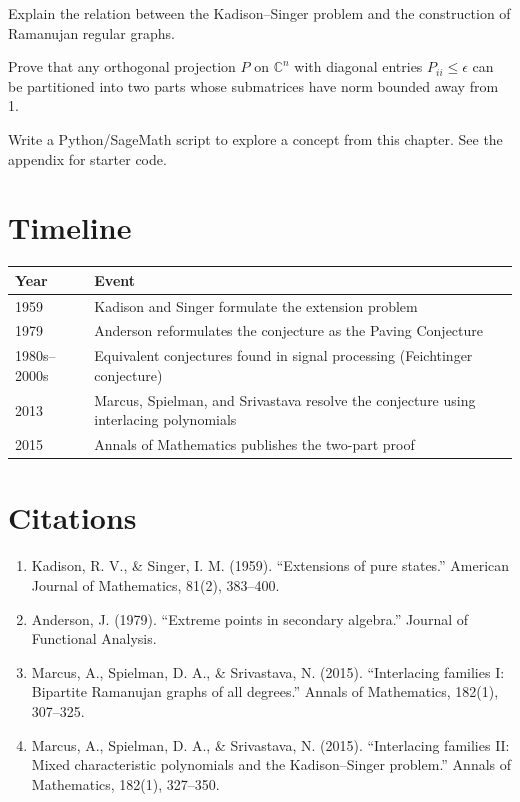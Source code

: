 \begin{exercise}[Intermediate]
Explain the relation between the Kadison--Singer problem and the construction of Ramanujan regular graphs.
\end{exercise}

\begin{exercise}[Challenge]
Prove that any orthogonal projection $P$ on $\mathbb{C}^n$ with diagonal entries $P_{ii} \leq \epsilon$ can be partitioned into two parts whose submatrices have norm bounded away from 1.
\end{exercise}

\begin{exercise}[Computational]
Write a Python/SageMath script to explore a concept from this chapter. See the appendix for starter code.
\end{exercise}

\section{Timeline}

\begin{tabularx}{\linewidth}{lX}
\toprule
\textbf{Year} & \textbf{Event} \\ \midrule
1959 & Kadison and Singer formulate the extension problem \cite{kadison1959} \\ 
1979 & Anderson reformulates the conjecture as the Paving Conjecture \cite{anderson1979} \\ 
1980s--2000s & Equivalent conjectures found in signal processing (Feichtinger conjecture) \\ 
2013 & Marcus, Spielman, and Srivastava resolve the conjecture using interlacing polynomials \cite{marcus2015a, marcus2015b} \\ 
2015 & Annals of Mathematics publishes the two-part proof \\ \bottomrule
\end{tabularx}

\section{Citations}

\begin{enumerate}
\item Kadison, R. V., \& Singer, I. M. (1959). ``Extensions of pure states.'' American Journal of Mathematics, 81(2), 383--400.
\item Anderson, J. (1979). ``Extreme points in secondary algebra.'' Journal of Functional Analysis.
\item Marcus, A., Spielman, D. A., \& Srivastava, N. (2015). ``Interlacing families I: Bipartite Ramanujan graphs of all degrees.'' Annals of Mathematics, 182(1), 307--325.
\item Marcus, A., Spielman, D. A., \& Srivastava, N. (2015). ``Interlacing families II: Mixed characteristic polynomials and the Kadison--Singer problem.'' Annals of Mathematics, 182(1), 327--350.
\end{enumerate}
